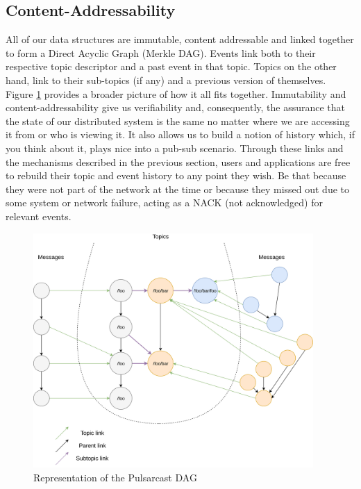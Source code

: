 \subsection{Content-Addressability}\label{subsec:content-addressability}

All of our data structures are immutable, content addressable and linked
together to form a Direct Acyclic Graph (Merkle DAG). Events link both to their
respective topic descriptor and a past event in that topic. Topics on the other
hand, link to their sub-topics (if any) and a previous version of themselves.
Figure \ref{fig:pulsarcast-dag} provides a broader picture of how it all fits
together. Immutability and content-addressability give us verifiability and,
consequently, the assurance that the state of our distributed system is the
same no matter where we are accessing it from or who is viewing it. It also
allows us to build a notion of history which, if you think about it, plays nice
into a pub-sub scenario. Through these links and the mechanisms described in
the previous section, users and applications are free to rebuild their topic
and event history to any point they wish. Be that because they were not part of
the network at the time or because they missed out due to some system or
network failure, acting as a NACK (not acknowledged) for relevant events.

\begin{figure}[hb!]
  \centering
  \includegraphics[width=0.95\textwidth]{img/pulsarcast-dag.png}
  \caption{Representation of the Pulsarcast DAG}
  \label{fig:pulsarcast-dag}
\end{figure}

